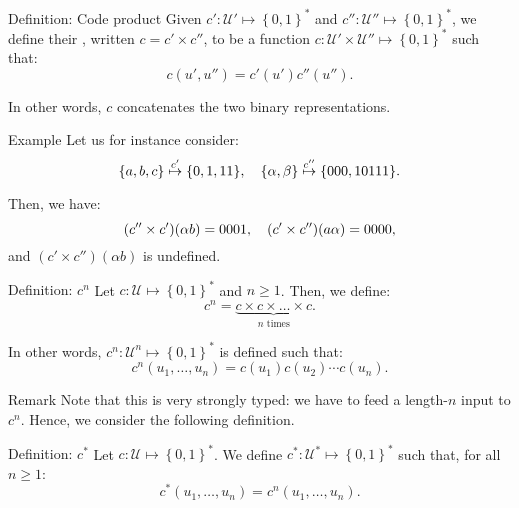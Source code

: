 \documentclass[a4paper]{article}
\begin{document}
\begin{parag}{Definition: Code product}
    Given $c': \mathcal{U}' \mapsto \left\{0, 1\right\}^*$ and $c'': \mathcal{U}'' \mapsto \left\{0, 1\right\}^*$, we define their , written $c = c' \times c''$, to be a function $c: \mathcal{U}' \times \mathcal{U}'' \mapsto \left\{0, 1\right\}^*$ such that: 
    \[c\left(u', u''\right) = c'\left(u'\right) c''\left(u''\right).\]
    
    In other words, $c$ concatenates the two binary representations.

    \begin{subparag}{Example}
        Let us for instance consider: 
        \[\left\{a, b, c\right\} \over{\mapsto}{$c'$} \left\{0, 1, 11\right\}, \mathspace \left\{\alpha, \beta\right\} \over{\mapsto}{$c''$} \left\{000, 10111\right\}.\]
        
        Then, we have: 
        \[\left(c'' \times c'\right)\left(\alpha b\right) = 0001, \mathspace \left(c' \times c''\right)\left(a \alpha\right) = 0000,\]
        and $\left(c' \times c''\right)\left(\alpha b\right)$ is undefined.
    \end{subparag}
\end{parag}

\begin{parag}{Definition: $c^n$}
    Let $c: \mathcal{U} \mapsto \left\{0, 1\right\}^*$ and $n \geq 1$. Then, we define: 
    \[c^n = \underbrace{c \times c \times \ldots \times c}_{\text{$n$ times}}.\]
    
    In other words, $c^n: \mathcal{U}^n \mapsto \left\{0, 1\right\}^*$ is defined such that: 
    \[c^n\left(u_1, \ldots, u_n\right) = c\left(u_1\right) c\left(u_2\right) \cdots c\left(u_n\right).\]

    \begin{subparag}{Remark}
        Note that this is very strongly typed: we have to feed a length-$n$ input to $c^n$. Hence, we consider the following definition.
    \end{subparag}
\end{parag}

\begin{parag}{Definition: $c^*$}
    Let $c: \mathcal{U} \mapsto \left\{0, 1\right\}^*$. We define $c^*: \mathcal{U}^* \mapsto \left\{0, 1\right\}^*$ such that, for all $n \geq 1$:
    \[c^*\left(u_1, \ldots, u_n\right) = c^n\left(u_1, \ldots, u_n\right).\]
\end{parag}
\end{document}
